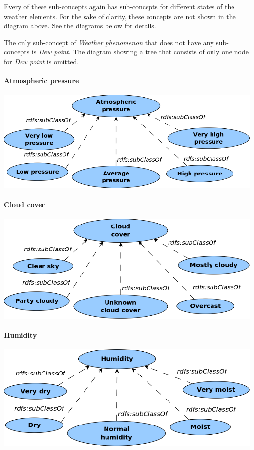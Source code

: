 Every of these sub-concepts again has sub-concepts for different states of the weather elements. For the sake of clarity, these concepts are not shown in the diagram above. See the diagrams below for details.

The only sub-concept of \emph{Weather phenomenon} that does not have any sub-concepts is \emph{Dew point}. The diagram showing a tree that consists of only one node for \emph{Dew point} is omitted.

\paragraph{Atmospheric pressure}

\begin{center}
  \includegraphics[width=.8\textwidth]{figures/diagrams/atmospheric-pressure.png}
\end{center}

\paragraph{Cloud cover}

\begin{center}
  \includegraphics[width=.8\textwidth]{figures/diagrams/cloud-cover.png}
\end{center}

\paragraph{Humidity}

\begin{center}
  \includegraphics[width=.8\textwidth]{figures/diagrams/humidity.png}
\end{center}

